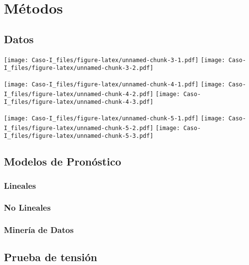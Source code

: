 \documentclass[
]{article}
\begin{document}
\hypertarget{muxe9todos}{%
\section{Métodos}\label{muxe9todos}}

\hypertarget{datos}{%
\subsection{Datos}\label{datos}}

\texttt{[image: Caso-I\_files/figure-latex/unnamed-chunk-3-1.pdf]} \texttt{[image: Caso-I\_files/figure-latex/unnamed-chunk-3-2.pdf]}

\texttt{[image: Caso-I\_files/figure-latex/unnamed-chunk-4-1.pdf]} \texttt{[image: Caso-I\_files/figure-latex/unnamed-chunk-4-2.pdf]} \texttt{[image: Caso-I\_files/figure-latex/unnamed-chunk-4-3.pdf]}

\texttt{[image: Caso-I\_files/figure-latex/unnamed-chunk-5-1.pdf]} \texttt{[image: Caso-I\_files/figure-latex/unnamed-chunk-5-2.pdf]} \texttt{[image: Caso-I\_files/figure-latex/unnamed-chunk-5-3.pdf]}

\hypertarget{modelos-de-pronuxf3stico}{%
\subsection{Modelos de Pronóstico}\label{modelos-de-pronuxf3stico}}

\hypertarget{lineales}{%
\subsubsection{Lineales}\label{lineales}}

\hypertarget{no-lineales}{%
\subsubsection{No Lineales}\label{no-lineales}}

\hypertarget{mineruxeda-de-datos}{%
\subsubsection{Minería de Datos}\label{mineruxeda-de-datos}}

\hypertarget{prueba-de-tensiuxf3n}{%
\subsection{Prueba de tensión}\label{prueba-de-tensiuxf3n}}
\end{document}
